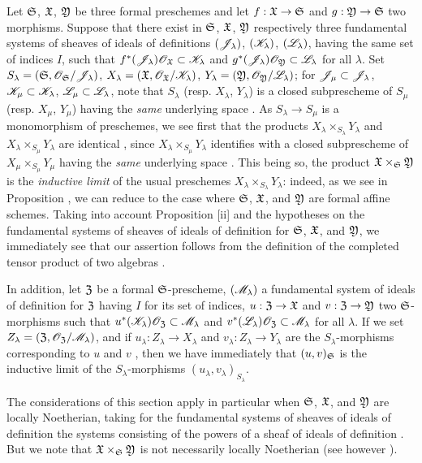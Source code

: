 \begin{env}[10.7.4]
\label{1.10.7.4}
Let $\mathfrak{S}$, $\mathfrak{X}$, $\mathfrak{Y}$ be three formal preschemes and let $f:\fk{X}\to\fk{S}$ and  $g:\fk{Y}\to\fk{S}$ two morphisms.
Suppose that there exist in $\mathfrak{S}$, $\mathfrak{X}$, $\mathfrak{Y}$ respectively three fundamental systems of sheaves of ideals of definitions $(\mathscr{J}_\lambda)$, $(\mathscr{K}_\lambda)$, $(\mathscr{L}_\lambda)$, having the same set of indices $I$, such that $f^*(\mathscr{J}_\lambda)\mathscr{O}_\mathfrak{X}\subset\mathscr{K}_\lambda$ and $g^*(\mathscr{J}_\lambda)\mathscr{O}_\mathfrak{Y}\subset\mathscr{L}_\lambda$ for all $\lambda$.
Set $S_\lambda=(\mathfrak{S},\mathscr{O}_\mathfrak{S}/\mathscr{J}_\lambda)$, $X_\lambda=(\mathfrak{X},\mathscr{O}_\mathfrak{X}/\mathscr{K}_\lambda)$, $Y_\lambda=(\mathfrak{Y},\mathscr{O}_\mathfrak{Y}/\mathscr{L}_\lambda)$; for $\mathscr{J}_\mu\subset\mathscr{J}_\lambda$, $\mathscr{K}_\mu\subset\mathscr{K}_\lambda$, $\mathscr{L}_\mu\subset\mathscr{L}_\lambda$, note that $S_\lambda$ (resp. $X_\lambda$, $Y_\lambda$) is a closed subprescheme of $S_\mu$ (resp. $X_\mu$, $Y_\mu$) having the \emph{same}
underlying space .
As $S_\lambda\to S_\mu$ is a monomorphism of preschemes, we see first that the products $X_\lambda\times_{S_\lambda}Y_\lambda$ and $X_\lambda\times_{S_\mu}Y_\lambda$ are identical , since $X_\lambda\times_{S_\mu}Y_\lambda$ identifies with a closed subprescheme of $X_\mu\times_{S_\mu}Y_\mu$ having the \emph{same} underlying space .
This being so, the product $\mathfrak{X}\times_\mathfrak{S}\mathfrak{Y}$ is the \emph{inductive limit} of the usual preschemes $X_\lambda\times_{S_\lambda}Y_\lambda$: indeed, as we see in Proposition , we can reduce to the case where $\mathfrak{S}$, $\mathfrak{X}$, and $\mathfrak{Y}$ are formal affine schemes.
Taking into account Proposition [ii] and the hypotheses on the fundamental systems of sheaves of ideals of definition for $\mathfrak{S}$, $\mathfrak{X}$, and $\mathfrak{Y}$, we immediately see that our assertion follows from the definition of the completed tensor product of two algebras .

In addition, let $\mathfrak{Z}$ be a formal $\mathfrak{S}$-prescheme, $(\mathscr{M}_\lambda)$ a fundamental system of ideals of definition for $\mathfrak{Z}$ having $I$ for its set of indices, $u:\fk{Z}\to\fk{X}$ and $v:\fk{Z}\to\fk{Y}$ two $\mathfrak{S}$-morphisms such that $u^*(\mathscr{K}_\lambda)\mathscr{O}_\mathfrak{Z}\subset\mathscr{M}_\lambda$ and $v^*(\mathscr{L}_\lambda)\mathscr{O}_\mathfrak{Z}\subset\mathscr{M}_\lambda$ for all $\lambda$.
If we set $Z_\lambda=(\mathfrak{Z},\mathscr{O}_\mathfrak{Z}/\mathscr{M}_\lambda)$, and if $u_\lambda:Z_\lambda\to X_\lambda$ and $v_\lambda:Z_\lambda\to Y_\lambda$ are the $S_\lambda$-morphisms corresponding to $u$ and $v$ , then we have immediately that $(u,v)_\mathfrak{S}$ is the inductive limit of the $S_\lambda$-morphisms $(u_\lambda,v_\lambda)_{S_\lambda}$.

The considerations of this section apply in particular when $\mathfrak{S}$, $\mathfrak{X}$, and $\mathfrak{Y}$ are locally Noetherian, taking for the fundamental systems of sheaves of ideals of definition the systems consisting of the powers of a sheaf of ideals of definition .
But we note that $\mathfrak{X}\times_\mathfrak{S}\mathfrak{Y}$ is not necessarily locally Noetherian (see however ).
\end{env}

